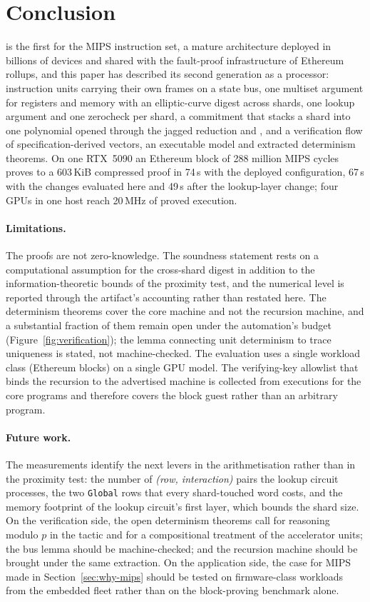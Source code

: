 \section{Conclusion}
\label{sec:conclusion}

\Ziren{} is the first \zkVM{} for the MIPS instruction set, a mature architecture deployed in billions of devices and shared with the fault-proof infrastructure of Ethereum rollups, and this paper has described its second generation as a processor: instruction units carrying their own frames on a state bus, one multiset argument for registers and memory with an elliptic-curve digest across shards, one lookup argument and one zerocheck per shard, a commitment that stacks a shard into one polynomial opened through the jagged reduction and \WHIR{}, and a verification flow of specification-derived vectors, an executable \Lean{} model and extracted determinism theorems. On one RTX~5090 an Ethereum block of 288 million MIPS cycles proves to a 603\,KiB compressed proof in 74\,s with the deployed configuration, 67\,s with the changes evaluated here and 49\,s after the lookup-layer change; four GPUs in one host reach 20\,MHz of proved execution.

\paragraph{Limitations.} The proofs are not zero-knowledge. The soundness statement rests on a computational assumption for the cross-shard digest in addition to the information-theoretic bounds of the proximity test, and the numerical level is reported through the artifact's accounting rather than restated here. The determinism theorems cover the core machine and not the recursion machine, and a substantial fraction of them remain open under the automation's budget (Figure~\ref{fig:verification}); the lemma connecting unit determinism to trace uniqueness is stated, not machine-checked. The evaluation uses a single workload class (Ethereum blocks) on a single GPU model. The verifying-key allowlist that binds the recursion to the advertised machine is collected from executions for the core programs and therefore covers the block guest rather than an arbitrary program.

\paragraph{Future work.} The measurements identify the next levers in the arithmetisation rather than in the proximity test: the number of \emph{(row, interaction)} pairs the lookup circuit processes, the two \texttt{Global} rows that every shard-touched word costs, and the memory footprint of the lookup circuit's first layer, which bounds the shard size. On the verification side, the open determinism theorems call for reasoning modulo $p$ in the tactic and for a compositional treatment of the accelerator units; the bus lemma should be machine-checked; and the recursion machine should be brought under the same extraction. On the application side, the case for MIPS made in Section~\ref{sec:why-mips} should be tested on firmware-class workloads from the embedded fleet rather than on the block-proving benchmark alone.

